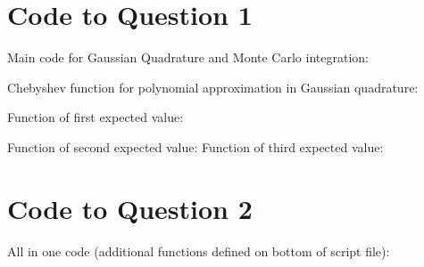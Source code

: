 \documentclass{article}
\begin{document}
	\newpage
	\begin{appendices}
		\section{Code to Question 1}
			Main code for Gaussian Quadrature and Monte Carlo integration:

Chebyshev function for polynomial approximation in Gaussian quadrature:

Function of first expected value:

Function of second expected value:
Function of third expected value:
		\section{Code to Question 2}
		All in one code (additional functions defined on bottom of script file):
		
	\end{appendices}
\end{document}

